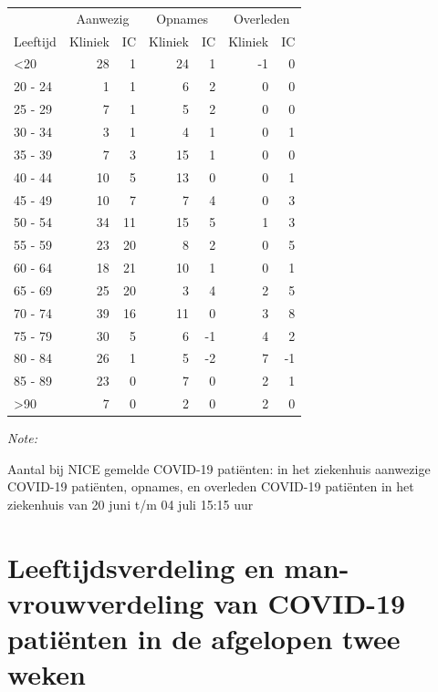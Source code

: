 \documentclass[
  english,
  man,floatsintext]{apa6}
\begin{document}
\begin{table}
\centering\begingroup\fontsize{10}{12}\selectfont

\begin{threeparttable}
\begin{tabular}{lrrrrrr}
\toprule
\multicolumn{1}{c}{ } & \multicolumn{2}{c}{Aanwezig} & \multicolumn{2}{c}{Opnames} & \multicolumn{2}{c}{Overleden} \\
\cmidrule(l{3pt}r{3pt}){2-3} \cmidrule(l{3pt}r{3pt}){4-5} \cmidrule(l{3pt}r{3pt}){6-7}
Leeftijd & Kliniek & IC & Kliniek & IC & Kliniek & IC\\
\midrule
<20 & 28 & 1 & 24 & 1 & -1 & 0\\
20 - 24 & 1 & 1 & 6 & 2 & 0 & 0\\
25 - 29 & 7 & 1 & 5 & 2 & 0 & 0\\
30 - 34 & 3 & 1 & 4 & 1 & 0 & 1\\
35 - 39 & 7 & 3 & 15 & 1 & 0 & 0\\
40 - 44 & 10 & 5 & 13 & 0 & 0 & 1\\
45 - 49 & 10 & 7 & 7 & 4 & 0 & 3\\
50 - 54 & 34 & 11 & 15 & 5 & 1 & 3\\
55 - 59 & 23 & 20 & 8 & 2 & 0 & 5\\
60 - 64 & 18 & 21 & 10 & 1 & 0 & 1\\
65 - 69 & 25 & 20 & 3 & 4 & 2 & 5\\
70 - 74 & 39 & 16 & 11 & 0 & 3 & 8\\
75 - 79 & 30 & 5 & 6 & -1 & 4 & 2\\
80 - 84 & 26 & 1 & 5 & -2 & 7 & -1\\
85 - 89 & 23 & 0 & 7 & 0 & 2 & 1\\
>90 & 7 & 0 & 2 & 0 & 2 & 0\\
\bottomrule
\end{tabular}
\begin{tablenotes}
\item \textit{Note: } 
\item Aantal bij NICE gemelde COVID-19 patiënten: in het ziekenhuis aanwezige COVID-19 patiënten, opnames, en overleden COVID-19 patiënten in het ziekenhuis van 20 juni t/m 04 juli 15:15 uur
\end{tablenotes}
\end{threeparttable}
\endgroup{}
\end{table}

\newpage

\hypertarget{leeftijdsverdeling-en-man-vrouwverdeling-van-covid-19-patiuxebnten-in-de-afgelopen-twee-weken}{%
\section{Leeftijdsverdeling en man-vrouwverdeling van COVID-19 patiënten in de afgelopen twee weken}\label{leeftijdsverdeling-en-man-vrouwverdeling-van-covid-19-patiuxebnten-in-de-afgelopen-twee-weken}}
\end{document}
